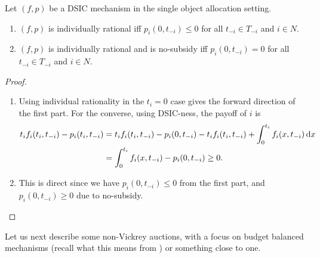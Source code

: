 		\begin{flem}
			\label{lem: dsic ir single object}
			Let $(f,p)$ be a DSIC mechanism in the single object allocation setting.
			\begin{enumerate}[label=(\alph*)]
				\item $(f,p)$ is individually rational iff $p_i(0,t_{-i}) \le 0$ for all $t_{-i} \in T_{-i}$ and $i \in N$.
				\item $(f,p)$ is individually rational and is no-subsidy iff $p_i(0,t_{-i}) = 0$ for all $t_{-i} \in T_{-i}$ and $i \in N$.
			\end{enumerate}
		\end{flem}
		\begin{proof}
			\phantom{pain}
			\begin{enumerate}[label=(\alph*)]
				\item Using individual rationality in the $t_i = 0$ case gives the forward direction of the first part. For the converse, using DSIC-ness, the payoff of $i$ is
				\begin{align*}
					t_i f_i(t_i,t_{-i}) - p_i(t_i,t_{-i}) &= t_i f_i(t_i,t_{-i}) - p_i(0,t_{-i}) - t_i f_i(t_i,t_{-i}) + \int_{0}^{t_i} f_i(x,t_{-i}) \dif x \\
						&= \int_0^{t_i} f_i(x,t_{-i}) - p_i(0,t_{-i}) \ge 0.
				\end{align*}

				 \item This is direct since we have $p_i(0,t_{-i}) \le 0$ from the first part, and $p_i(0,t_{-i}) \ge 0$ due to no-subsidy.
			\end{enumerate}
		\end{proof}

		Let us next describe some non-Vickrey auctions, with a focus on budget balanced mechanisms (recall what this means from ) or something close to one.

